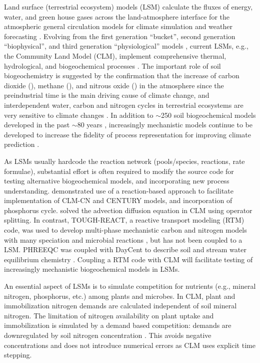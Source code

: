 \documentclass[gmd, manuscript]{copernicus}
\begin{document}
\introduction  %
Land surface (terrestrial ecosystem) models (LSM) calculate the fluxes of energy, water, and green house gases across the land-atmosphere interface for
the atmospheric general circulation models for climate simulation and weather forecasting \citep{Sellers1997}. Evolving from the first generation ``bucket'',
second generation ``biophysical'', and third generation ``physiological'' models \citep{Seneviratne2010}, current LSMs, e.g., the Community Land Model (CLM), implement comprehensive thermal, hydrological, and biogeochemical processes \citep{Oleson2013}. The important role of soil biogeochemistry is suggested by the confirmation that the increase of carbon dioxide (), methane (), and nitrous oxide () in the atmosphere since the preindustrial time is the main driving cause of climate change, and interdependent water, carbon and nitrogen cycles in terrestrial ecosystems are very sensitive to climate changes \citep{IPCC2013}. In addition to $\sim$250 soil biogeochemical models developed in the past $\sim$80 years \citep{Manzoni2009}, increasingly mechanistic models continue to be developed to increase the fidelity of process representation for improving
climate prediction \citep[e.g.,][]{Riley2014}. 

As LSMs usually hardcode the reaction network (pools/species, reactions, rate formulae), substantial effort is often required to modify the source code for testing alternative biogeochemical models, and incorporating new process understanding. \citet{Fang2013} demonstrated use of a reaction-based approach to facilitate implementation of CLM-CN and CENTURY models, and incorporation of phosphorus cycle.  \citet{Tang2013b} solved the advection diffusion equation in CLM using operator splitting. In contrast, TOUGH-REACT, a reactive transport modeling (RTM) code, was used to develop multi-phase mechanistic carbon and nitrogen models with many speciation and microbial reactions \citep{Maggi2008,Gu2010,Riley2014}, but has not been coupled to a LSM. PHREEQC was coupled with DayCent to describe  soil and stream water equilibrium chemistry  \citep{Hartman2007}. Coupling a RTM code with CLM will facilitate testing of increasingly mechanistic biogeochemical models in LSMs.

An essential aspect of LSMs is to simulate competition for nutrients (e.g., mineral nitrogen, phosphorus, etc.) among plants and microbes. In CLM,  plant and immobilization nitrogen demands are calculated independent of soil mineral nitrogen. The limitation of nitrogen availability on plant uptake and immobilization is simulated by a demand based competition: demands are downregulated by soil nitrogen concentration \citep{Oleson2013,Thornton2005}. This avoids negative concentrations and does not introduce numerical errors \citep{Tang2015} as CLM uses explicit time stepping. 
\end{document}
